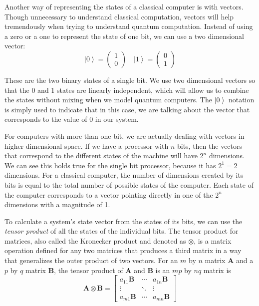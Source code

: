 \documentclass[11pt]{report}
\newcommand{\?}{\stackrel{?}{=}}
\begin{document}
Another way of representing the states of a classical computer is with vectors. Though unnecessary to understand classical computation, vectors will help tremendously when trying to understand quantum computation. Instead of using a zero or a one to represent the state of one bit, we can use a two dimensional vector:
$$\left | 0 \right \rangle=\begin{pmatrix}1\\ 0\end{pmatrix} \quad \left | 1 \right \rangle=\begin{pmatrix}0\\ 1\end{pmatrix}$$
             
These are the two binary states of a single bit. We use two dimensional vectors so that the 0 and 1 states are linearly independent, which will allow us to combine the states without mixing when we model quantum computers. The $\left | 0 \right \rangle$ notation is simply used to indicate that in this case, we are talking about the vector that corresponds to the value of 0 in our system. 

For computers with more than one bit, we are actually dealing with vectors in higher dimensional space. If we have a processor with $n$ bits, then the vectors that correspond to the different states of the machine will have $2^n$ dimensions. We can see this holds true for the single bit processor, because it has $2^1=2$ dimensions. For a classical computer, the number of dimensions created by its bits is equal to the total number of possible states of the computer. Each state of the computer corresponds to a vector pointing directly in one of the $2^n$ dimensions with a magnitude of 1.

To calculate a system's state vector from the states of its bits, we can use the \textit{tensor product} of all the states of the individual bits. The tensor product for matrices, also called the Kronecker product and denoted as $\otimes$, is a matrix operation defined for any two matrices that produces a third matrix in a way that generalizes the outer product of two vectors. For an $m$ by $n$ matrix $\mathbf{A}$ and a $p$ by $q$ matrix $\mathbf{B}$, the tensor product of $\mathbf{A}$ and $\mathbf{B}$ is an $mp$ by $nq$ matrix is
$$\mathbf{A}\otimes\mathbf{B} = \begin{bmatrix} a_{11} \mathbf{B} & \cdots & a_{1n}\mathbf{B} \\ \vdots & \ddots & \vdots \\ a_{m1} \mathbf{B} & \cdots & a_{mn} \mathbf{B} \end{bmatrix}$$
\end{document}
